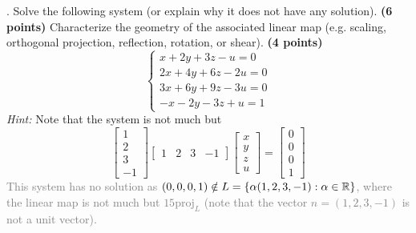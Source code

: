 \documentclass[12pt,a4paper]{article}
\newcommand{\gray}[1]{\textcolor{gray}{#1}}
\renewcommand{\l}{\left}
\renewcommand{\r}{\right}
\def\R{\ifmmode\mathbb R\fi}
\begin{document}
\newpage
{}. Solve the following system (or explain why it does not have any solution). \textbf{(6 points)} Characterize the geometry of the associated linear map (e.g. scaling, orthogonal projection, reflection, rotation, or shear). \textbf{(4 points)}
\begin{equation*}
	\l\{
	\begin{array}{l}
		x+2y+3z-u=0\\
		2x+4y+6z-2u=0\\
		3x+6y+9z-3u=0\\
		-x-2y-3z+u=1
	\end{array}
	\r.
\end{equation*}
\textit{Hint:} Note that the system is not much but 
$$
	\l[
	\begin{array}{c}
		1\\
		2\\
		3\\
		-1
	\end{array}
	\r]
	\l[
	\begin{array}{cccc}
		1 & 2 & 3 & -1
	\end{array}
	\r]
	\l[
	\begin{array}{c}
		x\\
		y\\
		z\\
		u
	\end{array}
	\r]
	=
	\l[
	\begin{array}{c}
		0\\
		0\\
		0\\
		1
	\end{array}
	\r]
$$
\gray{
This system has no solution as $(0, 0, 0, 1) \notin L = \{\alpha(1, 2, 3, -1) : \alpha\in\R\}$, where the linear map is not much but $15\mbox{proj}_L$ (note that the vector $n = (1, 2, 3, -1)$ is not a unit vector).
}
\end{document}
